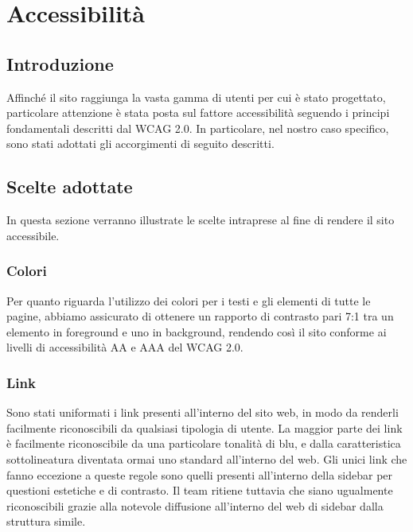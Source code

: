 \documentclass[12pt]{article}
\begin{document}
	\section{Accessibilità}
	\subsection{Introduzione}
	Affinché il sito raggiunga la vasta gamma di utenti per cui è stato progettato, particolare attenzione è stata posta sul fattore accessibilità seguendo i principi fondamentali descritti dal WCAG 2.0. In particolare, nel nostro caso specifico, sono stati adottati gli accorgimenti di seguito descritti.
	\subsection{Scelte adottate}
	In questa sezione verranno illustrate le scelte intraprese al fine di rendere il sito accessibile.
	\subsubsection{Colori}
	Per quanto riguarda l'utilizzo dei colori per i testi e gli elementi di tutte le pagine, abbiamo assicurato di ottenere un rapporto di contrasto pari 7:1 tra un elemento in foreground e uno in background, rendendo così il sito conforme ai livelli di accessibilità AA e AAA del WCAG 2.0. 
	\subsubsection{Link}
	Sono stati uniformati i link presenti all'interno del sito web, in modo da renderli facilmente riconoscibili da qualsiasi tipologia di utente. La maggior parte dei link è facilmente riconoscibile da una particolare tonalità di blu, e dalla caratteristica sottolineatura diventata ormai uno standard all'interno del web. Gli unici link che fanno eccezione a queste regole sono quelli presenti all'interno della sidebar per questioni estetiche e di contrasto. Il team ritiene tuttavia che siano ugualmente riconoscibili grazie alla notevole diffusione all'interno del web di sidebar dalla struttura simile. 
\end{document}
